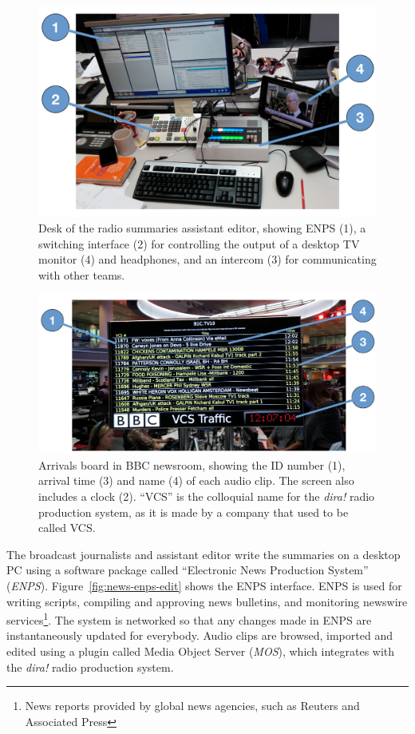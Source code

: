 \begin{figure}[p]
  \centering
  \includegraphics[width=\columnwidth]{figs/news-desk-labelled.pdf}
  \caption{Desk of the radio summaries assistant editor, showing ENPS (1), a switching interface (2) for controlling
  the output of a desktop TV monitor (4) and headphones, and an intercom (3) for communicating with other teams.}
  \label{fig:news-desktop}
\end{figure}

\begin{figure}[p]
  \centering
  \includegraphics[width=\columnwidth]{figs/arrivals-board-labelled.pdf}
  \caption{Arrivals board in BBC newsroom, showing the ID number (1), arrival time (3) and name (4) of each audio clip.
  The screen also includes a clock (2). ``VCS'' is the colloquial name for the \textit{dira!} radio production system,
  as it is made by a company that used to be called VCS.}
  \label{fig:news-arrivals}
\end{figure}

The broadcast journalists and assistant editor write the summaries on a desktop PC using a software package called
``Electronic News Production System'' (\textit{ENPS}). Figure~\ref{fig:news-enps-edit} shows the ENPS interface. ENPS
is used for writing scripts, compiling and approving news bulletins, and monitoring newswire services\footnote{News
reports provided by global news agencies, such as Reuters and Associated Press}. The system is networked so that any
changes made in ENPS are instantaneously updated for everybody. Audio clips are browsed, imported and edited using a
plugin called Media Object Server (\textit{MOS}), which integrates with the \textit{dira!} radio production system.

